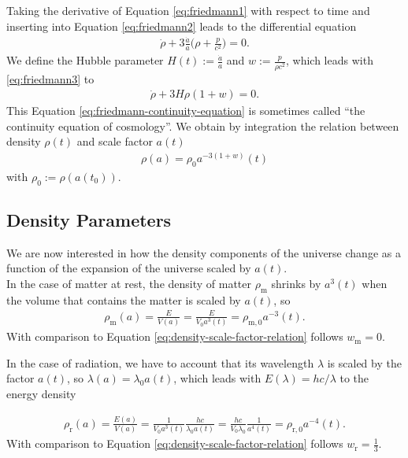 \noindent Taking the derivative of Equation \eqref{eq:friedmann1} with respect to time and inserting into Equation \eqref{eq:friedmann2} leads to the differential equation 
\begin{align}
    \dot{\rho} + 3\frac{\dot{a}}{a} \biggl( \rho + \frac{p}{c^2} \biggr) = 0. \label{eq:friedmann3}
\end{align}
We define the Hubble parameter $\displaystyle H(t):= \frac{\dot{a}}{a}$ and $\displaystyle w := \frac{p}{\rho c^2}$, which leads with \eqref{eq:friedmann3} to 
\begin{align}
    \dot{\rho} + 3H\rho(1+w) = 0. \label{eq:friedmann-continuity-equation}  
\end{align}
This Equation \eqref{eq:friedmann-continuity-equation} is sometimes called ``the continuity equation of cosmology''. We obtain by integration the relation between density $\rho(t)$ and scale factor $a(t)$ 
\begin{align}
    \rho(a) = \rho_{0} a^{-3(1 + w)}(t) \label{eq:density-scale-factor-relation} 
\end{align}
with $\rho_{0} := \rho(a(t_{0}))$.


\subsection{Density Parameters}

\noindent We are now interested in how the density components of the universe change as a function of the expansion of the universe scaled by $a(t)$. \\

\noindent In the case of matter at rest, the density of matter $\rho_{\text{m}}$ shrinks by $a^{3}(t)$ when the volume that contains the matter is scaled by $a(t)$, so 
\begin{align}
    \rho_{\text{m}}(a) = \frac{E}{V(a)} = \frac{E}{V_{0} a^{3}(t)} = \rho_{\text{m}, 0} a^{-3}(t). \label{eq:matter-density-scale} 
\end{align}
With comparison to Equation \eqref{eq:density-scale-factor-relation} follows $w_{\text{m}} = 0$.

\noindent In the case of radiation, we have to account that its wavelength $\lambda$ is scaled by the factor $a(t)$, so $\lambda(a) = \lambda_{0} a(t)$, which leads with $E(\lambda) = h c / \lambda$ to the energy density

\begin{align}
    \rho_{\text{r}}(a) = \frac{E(a)}{V(a)} = \frac{1}{V_{0} a^3(t)} \frac{h c}{\lambda_{0} a(t)} = \frac{h c}{V_{0} \lambda_{0}} \frac{1}{a^{4}(t)} = \rho_{\text{r},0} a^{-4}(t). \label{eq:radiation-density-scale}
\end{align}
With comparison to Equation \eqref{eq:density-scale-factor-relation} follows $w_{\text{r}} = \frac{1}{3}$.

